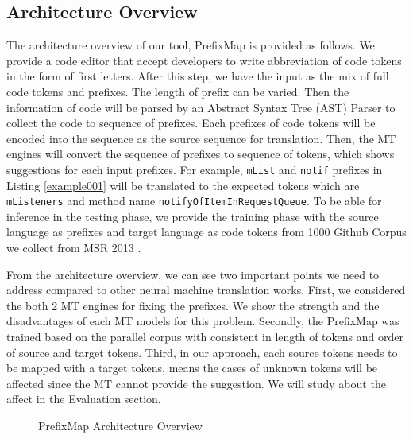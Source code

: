 \subsection{Architecture Overview}
The architecture overview of our tool, PrefixMap is provided as follows. We provide a code editor that accept developers to write abbreviation of code tokens in the form of first letters. After this step, we have the input as the mix of full code tokens and prefixes. The length of prefix can be varied. Then the information of code will be parsed by an Abstract Syntax Tree (AST) Parser to collect the code to sequence of prefixes. Each prefixes of code tokens will be encoded into the sequence as the source sequence for translation. Then, the MT engines will convert the sequence of prefixes to sequence of tokens, which shows suggestions for each input prefixes. For example, \texttt{mList} and \texttt{notif} prefixes in Listing \ref{example001} will be translated to the expected tokens which are \texttt{mListeners} and method name \texttt{notifyOfItemInRequestQueue}. To be able for inference in the testing phase, we provide the training phase with the source language as prefixes and target language as code tokens from 1000 Github Corpus we collect from MSR 2013 \cite{031}.

From the architecture overview, we can see two important points we need to address compared to other neural machine translation works. First, we considered the both 2 MT engines for fixing the prefixes. We show the strength and the disadvantages of each MT models for this problem. Secondly, the PrefixMap was trained based on the parallel corpus with consistent in length of tokens and order of source and target tokens. Third, in our approach, each source tokens needs to be mapped with a target tokens, means the cases of unknown tokens will be affected since the MT cannot provide the suggestion. We will study about the affect in the Evaluation section.

\begin{figure}
        \caption{PrefixMap Architecture Overview}
        \label{fig:mapping_expression} 
\end{figure}
